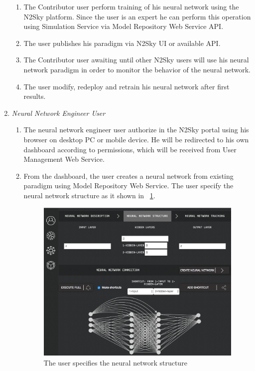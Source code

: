 \documentclass[10pt, conference, compsocconf]{IEEEtran}
\begin{document}
\begin{enumerate}
\begin{enumerate}
\item The Contributor user perform training of his neural network using the N2Sky platform. Since the user is an expert he can perform this operation using Simulation Service via Model Repository Web Service API.
\item The user publishes his paradigm via N2Sky UI or available API. 
\item The Contributor user awaiting until other N2Sky users will use his neural network paradigm in order to monitor the behavior of the neural network. 
\item The user modify, redeploy and retrain his neural network after first results. 
\end{enumerate}
\item \emph{Neural Network Engineer User}
\begin{enumerate}
\item The neural network engineer user authorize in the N2Sky portal using his browser on desktop PC or mobile device. He will be redirected to his own dashboard according to permissions, which will be received from User Management Web Service. 
\item From the dashboard, the user creates a neural network from existing paradigm using Model Repository Web Service. The user specify the neural network structure as it shown in ~\ref{fig:structure}.


\begin{figure}[H]
  \includegraphics[width=\linewidth]{img/structure.png}
  \caption{The user specifies the neural network structure}
  \label{fig:structure}
\end{figure}


\end{enumerate}
\end{enumerate}
\end{document}
